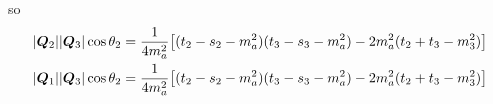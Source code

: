 so 
\begin{align}
    |\bm{Q}_{2}||\bm{Q}_{3}| \cos \theta_2 &= 
        \frac{1}{4m_a^2}
        \big[
            (t_2 - s_2 - m_a^2)(t_{3} - s_{3} - m_a^2) - 2m_a^2(t_2 + t_{3} - m_3^2)
        \big] \\
    |\bm{Q}_{1}||\bm{Q}_{3}| \cos \theta_2 &= 
        \frac{1}{4m_a^2}
        \big[
            (t_2 - s_2 - m_a^2)(t_{3} - s_{3} - m_a^2) - 2m_a^2(t_2 + t_{3} - m_3^2)
        \big] \\
\end{align}